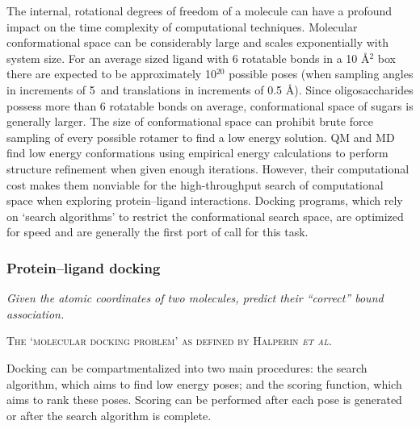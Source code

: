 \documentclass[journal=jctcce,manuscript=article]{achemso}
\let\originalepigraph\epigraph
\renewcommand\epigraph[2]{\originalepigraph{\textit{#1}}{\textsc{#2}}}
\begin{document}
{The internal, rotational degrees of freedom of a molecule can have a profound impact on the time complexity of computational techniques.\cite{Halperin2002PrinciplesFunctions}
Molecular conformational space can be considerably large and scales exponentially with system size.\cite{Zsoldos2007EHiTS:System}
For an average sized ligand with 6 rotatable bonds in a 10 \AA$^{2}$ box there are expected to be approximately 10$^{20}$ possible poses (when sampling angles in increments of 5\textdegree~and translations in increments of 0.5 \AA).\cite{Zsoldos2007EHiTS:System}
Since oligosaccharides possess more than 6 rotatable bonds on average, conformational space of sugars is generally larger. \cite{Nivedha2016Vina-Carb:Docking}
The size of conformational space can prohibit brute force sampling of every possible rotamer to find a low energy solution. \cite{Zsoldos2007EHiTS:System}
\ac{QM} and \ac{MD} find low energy conformations using empirical energy calculations to perform structure refinement when given enough iterations.\cite{Jensen2007IntroductionEdition, Dror2012BiomolecularBiology}
However, their computational cost makes them nonviable for the high-throughput search of computational space when exploring protein--ligand interactions. \cite{Jensen2007IntroductionEdition, Engler2018Multiple-ChoiceMolecules}
Docking programs, which rely on `search algorithms' to restrict the conformational search space, are optimized for speed and are generally the first port of call for this task. \cite{Halperin2002PrinciplesFunctions, Bostrom2001ReproducingTools} 



\subsubsection{Protein--ligand docking}

\epigraph{Given the atomic coordinates of two molecules, predict their “correct” bound association.}{The `molecular docking problem' as defined by Halperin \textit{et al}.\cite{Halperin2002PrinciplesFunctions}}

{\setlength\parindent{0pt} Docking can be compartmentalized into two main procedures: the search algorithm, which aims to find low energy poses; and the scoring function, which aims to rank these poses.\cite{Halperin2002PrinciplesFunctions, Schulz-Gasch2004ScoringPerspective, Pagadala2017SoftwareReview} 
Scoring can be performed after each pose is generated or after the search algorithm is complete. \cite{Halperin2002PrinciplesFunctions} 

}}
\end{document}
